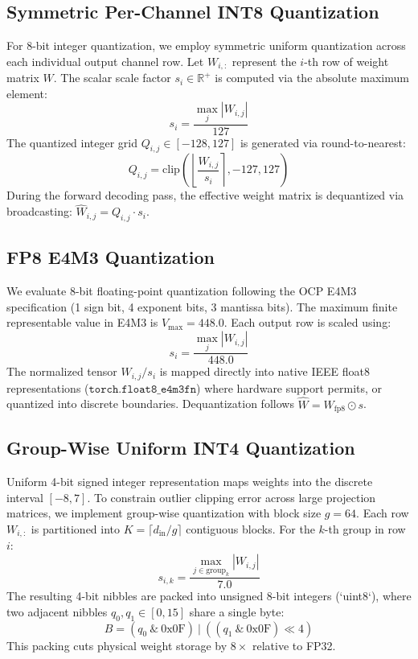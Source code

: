 \documentclass[conference]{IEEEtran}
\begin{document}
\subsection{Symmetric Per-Channel INT8 Quantization}
For 8-bit integer quantization, we employ symmetric uniform quantization across each individual output channel row. Let $W_{i, :}$ represent the $i$-th row of weight matrix $W$. The scalar scale factor $s_i \in \mathbb{R}^+$ is computed via the absolute maximum element:
\begin{equation}
s_i = \frac{\max_{j} |W_{i, j}|}{127}
\end{equation}
The quantized integer grid $Q_{i, j} \in [-128, 127]$ is generated via round-to-nearest:
\begin{equation}
Q_{i, j} = \text{clip}\left( \left\lfloor \frac{W_{i, j}}{s_i} \right\rceil, -127, 127 \right)
\end{equation}
During the forward decoding pass, the effective weight matrix is dequantized via broadcasting: $\hat{W}_{i, j} = Q_{i, j} \cdot s_i$.

\subsection{FP8 E4M3 Quantization}
We evaluate 8-bit floating-point quantization following the OCP E4M3 specification (1 sign bit, 4 exponent bits, 3 mantissa bits). The maximum finite representable value in E4M3 is $V_{\max} = 448.0$. Each output row is scaled using:
\begin{equation}
s_i = \frac{\max_{j} |W_{i, j}|}{448.0}
\end{equation}
The normalized tensor $W_{i, j} / s_i$ is mapped directly into native IEEE float8 representations ($\texttt{torch.float8\_e4m3fn}$) where hardware support permits, or quantized into discrete boundaries. Dequantization follows $\hat{W} = W_{\text{fp8}} \odot s$.

\subsection{Group-Wise Uniform INT4 Quantization}
Uniform 4-bit signed integer representation maps weights into the discrete interval $[-8, 7]$. To constrain outlier clipping error across large projection matrices, we implement group-wise quantization with block size $g = 64$. Each row $W_{i, :}$ is partitioned into $K = \lceil d_{\text{in}} / g \rceil$ contiguous blocks. For the $k$-th group in row $i$:
\begin{equation}
s_{i, k} = \frac{\max_{j \in \text{group}_k} |W_{i, j}|}{7.0}
\end{equation}
The resulting 4-bit nibbles are packed into unsigned 8-bit integers (`uint8`), where two adjacent nibbles $q_0, q_1 \in [0, 15]$ share a single byte:
\begin{equation}
B = (q_0 \ \& \ \text{0x0F}) \ | \ ((q_1 \ \& \ \text{0x0F}) \ll 4)
\end{equation}
This packing cuts physical weight storage by $8\times$ relative to FP32.
\end{document}
